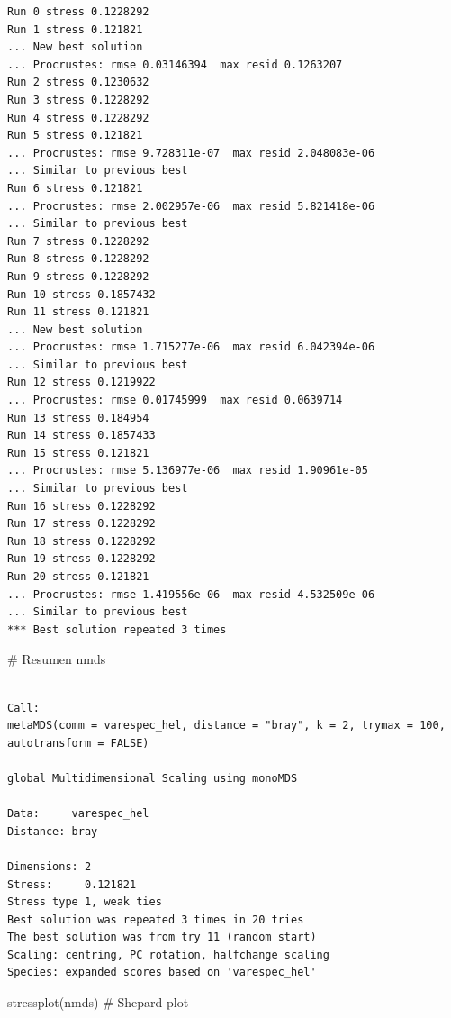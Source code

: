 \documentclass[
  spanish,
  11pt,
  a4paper,
  DIV=11,
  numbers=noendperiod]{scrartcl}
\newenvironment{Shaded}{\begin{snugshade}}{\end{snugshade}}
\newcommand{\CommentTok}[1]{\textcolor[rgb]{0.37,0.37,0.37}{#1}}
\newcommand{\FunctionTok}[1]{\textcolor[rgb]{0.28,0.35,0.67}{#1}}
\newcommand{\NormalTok}[1]{\textcolor[rgb]{0.00,0.23,0.31}{#1}}
\begin{document}
\begin{verbatim}
Run 0 stress 0.1228292 
Run 1 stress 0.121821 
... New best solution
... Procrustes: rmse 0.03146394  max resid 0.1263207 
Run 2 stress 0.1230632 
Run 3 stress 0.1228292 
Run 4 stress 0.1228292 
Run 5 stress 0.121821 
... Procrustes: rmse 9.728311e-07  max resid 2.048083e-06 
... Similar to previous best
Run 6 stress 0.121821 
... Procrustes: rmse 2.002957e-06  max resid 5.821418e-06 
... Similar to previous best
Run 7 stress 0.1228292 
Run 8 stress 0.1228292 
Run 9 stress 0.1228292 
Run 10 stress 0.1857432 
Run 11 stress 0.121821 
... New best solution
... Procrustes: rmse 1.715277e-06  max resid 6.042394e-06 
... Similar to previous best
Run 12 stress 0.1219922 
... Procrustes: rmse 0.01745999  max resid 0.0639714 
Run 13 stress 0.184954 
Run 14 stress 0.1857433 
Run 15 stress 0.121821 
... Procrustes: rmse 5.136977e-06  max resid 1.90961e-05 
... Similar to previous best
Run 16 stress 0.1228292 
Run 17 stress 0.1228292 
Run 18 stress 0.1228292 
Run 19 stress 0.1228292 
Run 20 stress 0.121821 
... Procrustes: rmse 1.419556e-06  max resid 4.532509e-06 
... Similar to previous best
*** Best solution repeated 3 times
\end{verbatim}

\begin{Shaded}
\begin{Highlighting}[numbers=left,,]
\CommentTok{\# Resumen}
\NormalTok{nmds}
\end{Highlighting}
\end{Shaded}

\begin{verbatim}

Call:
metaMDS(comm = varespec_hel, distance = "bray", k = 2, trymax = 100,      autotransform = FALSE) 

global Multidimensional Scaling using monoMDS

Data:     varespec_hel 
Distance: bray 

Dimensions: 2 
Stress:     0.121821 
Stress type 1, weak ties
Best solution was repeated 3 times in 20 tries
The best solution was from try 11 (random start)
Scaling: centring, PC rotation, halfchange scaling 
Species: expanded scores based on 'varespec_hel' 
\end{verbatim}

\begin{Shaded}
\begin{Highlighting}[numbers=left,,]
\FunctionTok{stressplot}\NormalTok{(nmds)  }\CommentTok{\# Shepard plot}
\end{Highlighting}
\end{Shaded}
\end{document}
